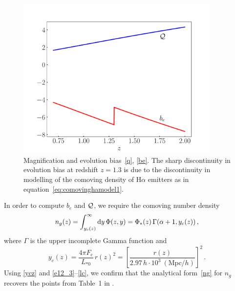 \begin{figure}[!ht]
\centering
\includegraphics[width=0.9\textwidth]{fig/beQ-eps-converted-to}
\caption{Magnification and evolution bias~\eqref{q}, \eqref{be}. The sharp discontinuity in evolution bias at redshift $z = 1.3$ is due to the discontinuity in modelling of the comoving density of H$\alpha$ emitters as in equation~\ref{eq:comovinghamodel1}.} 
\label{fig2}
\end{figure}

In order to compute $b_{e}$ and $\mathcal{Q}$, we require the comoving number density
\begin{equation} \label{ng}
n_g(z)=\int_{y_c(z)}^\infty {\mathrm{d}y}\, \Phi(z,y) = \Phi_*(z) \, \Gamma({\alpha+1}, y_c(z)) \,,
\end{equation}
where $\Gamma$ is the upper incomplete Gamma function and
\begin{equation}  \label{ycz}
y_c(z) = \frac{4\pi F_{\mathrm{c}}}{L_{*0}}\, {r}(z)^2  = \left[ \frac{{r}(z)}{2.97\,h\cdot 10^3~ ({\mathrm{Mpc}}/h)}\right]^2 \,.
\end{equation}
Using \eqref{ycz} and \eqref{e12_3}--\eqref{lc},  we confirm that the analytical form~\eqref{ng} for $n_g$ recovers the points from Table~1 in \cite{Yankelevich:2018uaz}. 

